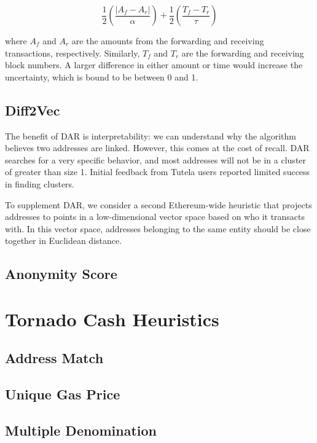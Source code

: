 \documentclass[11pt,a4paper]{article}
\begin{document}
\begin{equation}
\frac{1}{2}\left(\frac{|A_f - A_r|}{\alpha}\right) + \frac{1}{2}\left(\frac{T_f - T_r}{\tau}\right)
\end{equation}

where $A_f$ and $A_r$ are the amounts from the forwarding and receiving transactions, respectively. Similarly, $T_f$ and $T_r$ are the forwarding and receiving block numbers.
A larger difference in either amount or time would increase the uncertainty, which is bound to be between 0 and 1.

\subsection{Diff2Vec}

The benefit of DAR is interpretability: we can understand why the algorithm believes two addresses are linked. However, this comes at the cost of recall. DAR searches for a very specific behavior, and most addresses will not be in a cluster of greater than size 1. Initial feedback from Tutela users reported limited success in finding clusters.

To supplement DAR, we consider a second Ethereum-wide heuristic that projects addresses to points in a low-dimensional vector space based on who it transacts with. In this vector space, addresses belonging to the same entity should be close together in Euclidean distance.

\subsection{Anonymity Score}
\label{sec:anonymityscore}

\section{Tornado Cash Heuristics}
\label{sec:tornado}

\subsection{Address Match}

\subsection{Unique Gas Price}

\subsection{Multiple Denomination}
\end{document}

